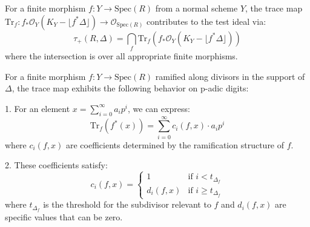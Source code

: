 \begin{definition}\label{def:trace-map}
For a finite morphism $f: Y \to \text{Spec}(R)$ from a normal scheme $Y$, the trace map $\text{Tr}_f: f_*\mathcal{O}_Y(K_Y - \lfloor f^*\Delta\rfloor) \to \mathcal{O}_{\text{Spec}(R)}$ contributes to the test ideal via:
$$\tau_+(R,\Delta) = \bigcap_{f} \text{Tr}_f(f_*\mathcal{O}_Y(K_Y - \lfloor f^*\Delta\rfloor))$$
where the intersection is over all appropriate finite morphisms.
\end{definition}

\begin{proposition}\label{prop:trace-map-digits}
For a finite morphism $f: Y \to \text{Spec}(R)$ ramified along divisors in the support of $\Delta$, the trace map exhibits the following behavior on p-adic digits:

1. For an element $x = \sum_{i=0}^{\infty} a_i p^i$, we can express:
   $$\text{Tr}_f(f^*(x)) = \sum_{i=0}^{\infty} c_i(f,x) \cdot a_i p^i$$
   where $c_i(f,x)$ are coefficients determined by the ramification structure of $f$.

2. These coefficients satisfy:
   $$c_i(f,x) = \begin{cases}
   1 & \text{if } i < t_{\Delta_f} \\
   d_i(f,x) & \text{if } i \geq t_{\Delta_f}
   \end{cases}$$
   where $t_{\Delta_f}$ is the threshold for the subdivisor relevant to $f$ and $d_i(f,x)$ are specific values that can be zero.
\end{proposition}


